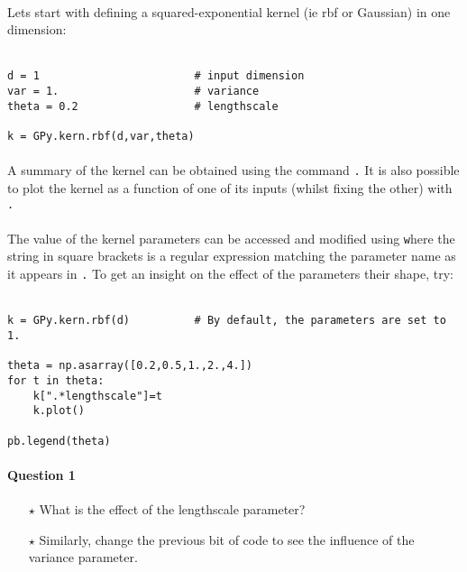 \documentclass{article}
\newcommand{\mintinline}[1]{\colorbox{bg}{\lstinline[basicstyle=\ttfamily]{#1}}}
\begin{document}
\paragraph{}
Lets start with defining a squared-exponential kernel (ie rbf or Gaussian) in one dimension: \\ \ \\
\begin{verbatim}
d = 1                        # input dimension
var = 1.                     # variance
theta = 0.2                  # lengthscale

k = GPy.kern.rbf(d,var,theta)
\end{verbatim}

\paragraph{}
A summary of the kernel can be obtained using the command \texttt. It is also possible to plot the kernel as a function of one of its inputs (whilst fixing the other) with \texttt.

\paragraph{}
The value of the kernel parameters can be accessed and modified using
\texttt where the string in square brackets is a regular
expression matching the parameter name as it appears in \texttt. To
get an insight on the effect of the parameters their shape, try: \\ \ \\
\begin{verbatim}
k = GPy.kern.rbf(d)          # By default, the parameters are set to 1.

theta = np.asarray([0.2,0.5,1.,2.,4.])
for t in theta:
    k[".*lengthscale"]=t 
    k.plot()

pb.legend(theta)
\end{verbatim}

\paragraph{Question 1}
\begin{itemize}
	\item[$\star$] What is the effect of the lengthscale parameter?
	\item[$\star$] Similarly, change the previous bit of code to see the influence of the variance parameter.
\end{itemize}
\end{document}
